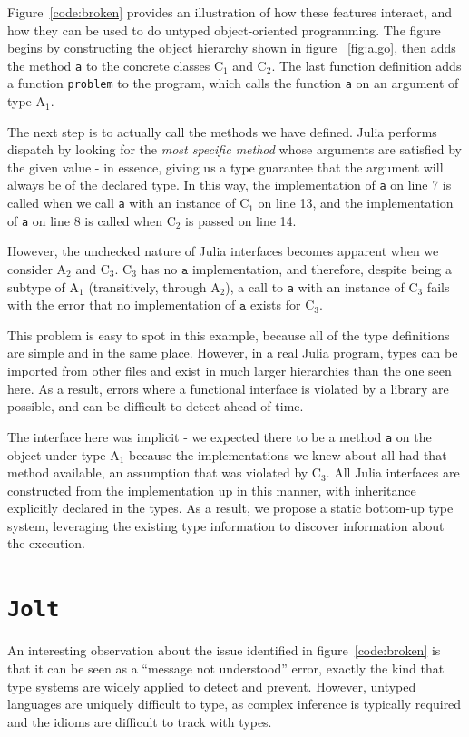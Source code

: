 \documentclass[preprint]{sigplanconf}
\newcommand{\xt}[1]{\texttt{#1}}
\newcommand{\jolt}{\xt{Jolt}}
\newcommand{\cnum}[2]{$\text{#1}_#2$}
\begin{document}
Figure~\ref{code:broken} provides an illustration of how these features 
interact, and how they can be used to do untyped object-oriented programming.
The figure begins by constructing the object hierarchy shown in figure~
\ref{fig:algo}, then adds the method \xt{a} to the concrete classes $\text{C}_1$ and
$\text{C}_2$. The last function definition adds a function \xt{problem} to the
program, which calls the function \xt{a} on an argument of type $\text{A}_1$.

The next step is to actually call the methods we have defined. Julia performs
dispatch by looking for the \emph{most specific method} whose arguments are
satisfied by the given value - in essence, giving us a type guarantee that the
argument will always be of the declared type. In this way, the implementation 
of \xt{a} on line 7 is called when we call \xt{a} with an instance of $\text{C}_1$
on line 13, and the implementation of \xt{a} on line 8 is called when 
$\text{C}_2$ is passed on line 14.

However, the unchecked nature of Julia interfaces becomes apparent when we consider
$\text{A}_2$ and $\text{C}_3$. \cnum{C}{3} has no $\xt{a}$ implementation, and
therefore, despite being a subtype of \cnum{A}{1} 
(transitively, through \cnum{A}{2}), a call to \xt{a} with an instance of \cnum{C}{3}
fails with the error that no implementation of $\xt{a}$ exists for \cnum{C}{3}.

This problem is easy to spot in this example, because all of the type definitions
are simple and in the same place. However, in a real Julia program, types can be
imported from other files and exist in much larger hierarchies than the one seen
here. As a result, errors where a functional interface is violated by a library
are possible, and can be difficult to detect ahead of time.

The interface here was implicit - we expected there to be a method \xt{a} on the
object under type \cnum{A}{1} because the implementations we knew about all had
that method available, an assumption that was violated by \cnum{C}{3}. All Julia
interfaces are constructed from the implementation up in this manner, with inheritance
explicitly declared in the types. As a result, we propose a static bottom-up type
system, leveraging the existing type information to discover information about the
execution.

\section{\jolt}
An interesting observation about the issue identified in figure~\ref{code:broken}
is that it can be seen as a ``message not understood'' error, exactly the kind
that type systems are widely applied to detect and prevent. However, untyped 
languages are uniquely difficult to type, as complex inference is typically
required and the idioms are difficult to track with types.
\end{document}
